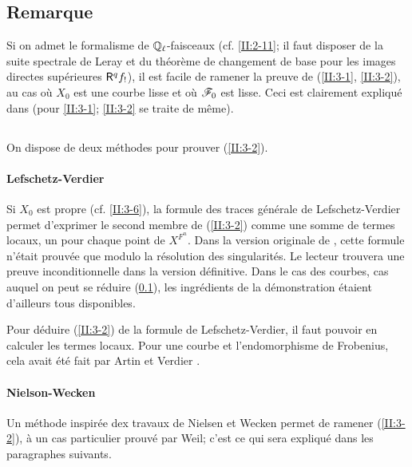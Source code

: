\subsection{Remarque}\label{II:3-7}

Si on admet le formalisme de $\mathbb{Q}_\ell$-faisceaux (cf. \ref{II:2-11}; il faut 
disposer de la suite spectrale de Leray et du théorème de changement de 
base pour les images directes supérieures $\mathsf{R}^q f_!$), il est facile de 
ramener la preuve de (\ref{II:3-1}, \ref{II:3-2}), au cas où $X_0$ est 
une courbe lisse et où $\mathscr{F}_0$ est lisse. Ceci est clairement expliqué 
dans \cite[\S 5]{gr95} (pour \ref{II:3-1}; \ref{II:3-2} se traite de même). 





\subsection{}\label{II:3-8}

On dispose de deux méthodes pour prouver (\ref{II:3-2}). 


\paragraph{Lefschetz-Verdier}
Si $X_0$ est propre (cf. \ref{II:3-6}), la formule des traces générale de 
Lefschetz-Verdier permet d'exprimer le second membre de (\ref{II:3-2}) comme 
une somme de termes locaux, un pour chaque point de $X^{F^n}$. Dans la version 
originale de \cite{SGA5}, cette formule n'était prouvée que modulo la 
résolution des singularités. Le lecteur trouvera une preuve inconditionnelle 
dans la version définitive. Dans le cas des courbes, cas auquel on peut se 
réduire (\ref{II:3-7}), les ingrédients de la démonstration étaient 
d'ailleurs tous disponibles. 

Pour déduire (\ref{II:3-2}) de la formule de Lefschetz-Verdier, il faut 
pouvoir en calculer les termes locaux. Pour une courbe et l'endomorphisme de 
Frobenius, cela avait été fait par Artin et Verdier \cite{ve67}. 


\paragraph{Nielson-Wecken}
Un méthode inspirée dex travaux de Nielsen et Wecken permet de ramener 
(\ref{II:3-2}), à un cas particulier prouvé par Weil; c'est ce qui sera 
expliqué dans les paragraphes suivants. 










